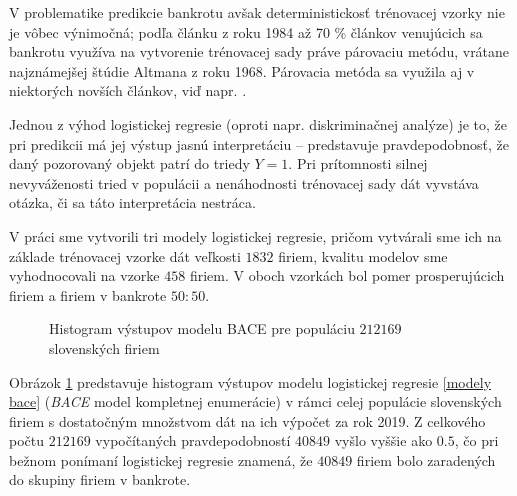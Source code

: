 V problematike predikcie bankrotu avšak deterministickosť trénovacej vzorky nie je vôbec výnimočná;
podľa článku \cite{zmijewski} z roku 1984 až 70 \% článkov venujúcich sa bankrotu využíva na vytvorenie trénovacej sady práve párovaciu metódu, vrátane najznámejšej štúdie Altmana z roku 1968.
Párovacia metóda sa využila aj v niektorých novších článkov, viď napr. \cite{bodle}.

Jednou z výhod logistickej regresie (oproti napr. diskriminačnej analýze) je to, že pri predikcii má jej výstup jasnú interpretáciu –
predstavuje pravdepodobnosť, že daný pozorovaný objekt patrí do triedy \(Y = 1\).
Pri prítomnosti silnej nevyváženosti tried v populácii a nenáhodnosti trénovacej sady dát vyvstáva otázka, či sa táto interpretácia nestráca.

V práci sme vytvorili tri modely logistickej regresie, pričom vytvárali sme ich na základe trénovacej vzorke dát veľkosti \(1832\) firiem, kvalitu modelov sme vyhodnocovali na vzorke \(458\) firiem.
V oboch vzorkách bol pomer prosperujúcich firiem a firiem v bankrote \(50:50\).

\begin{figure}
\caption{Histogram výstupov modelu BACE pre populáciu \(212169\) slovenských firiem}
\label{model_bace_whole_pop}
\end{figure}

Obrázok \ref{model_bace_whole_pop} predstavuje histogram výstupov modelu logistickej regresie \autoref{modely bace} (\emph{BACE} model kompletnej enumerácie)
v rámci celej populácie slovenských firiem s dostatočným množstvom dát na ich výpočet za rok 2019.
Z celkového počtu \(212169\) vypočítaných pravdepodobností \(40849\) vyšlo vyššie ako \(0.5\),
čo pri bežnom ponímaní logistickej regresie znamená, že \(40849\) firiem bolo zaradených do skupiny firiem v bankrote.

